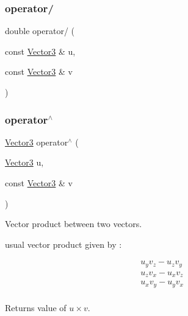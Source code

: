 \mbox{\label{class_vector3_a87668fe6d96f1826fb2721883d194ad3}} 
\subsubsection{\texorpdfstring{operator/}{operator/}\hspace{0.1cm}{\footnotesize\ttfamily [2/2]}}
{\footnotesize\ttfamily double operator/ (\begin{DoxyParamCaption}\item[{const \mbox{\hyperlink{class_vector3}{Vector3}} \&}]{u,  }\item[{const \mbox{\hyperlink{class_vector3}{Vector3}} \&}]{v }\end{DoxyParamCaption})\hspace{0.3cm}{\ttfamily [friend]}}

\mbox{\label{class_vector3_adb4922062355e087babc81e8d5b7c05f}} 
\subsubsection{\texorpdfstring{operator$^\wedge$}{operator^}}
{\footnotesize\ttfamily \mbox{\hyperlink{class_vector3}{Vector3}} operator$^\wedge$ (\begin{DoxyParamCaption}\item[{\mbox{\hyperlink{class_vector3}{Vector3}}}]{u,  }\item[{const \mbox{\hyperlink{class_vector3}{Vector3}} \&}]{v }\end{DoxyParamCaption})\hspace{0.3cm}{\ttfamily [friend]}}



Vector product between two vectors. 

usual vector product given by \+:

\[ \begin{align*} & u_y v_z - u_z v_y \\ & u_z v_x - u_x v_z \\ & u_x v_y - u_y v_x \\ \end{align*} \] \begin{DoxyReturn}{Returns}
value of $ u \times v $. 
\end{DoxyReturn}
\mbox{\label{class_vector3_ab7427dc980f710e550fb4de32f0dfcbb}} 
